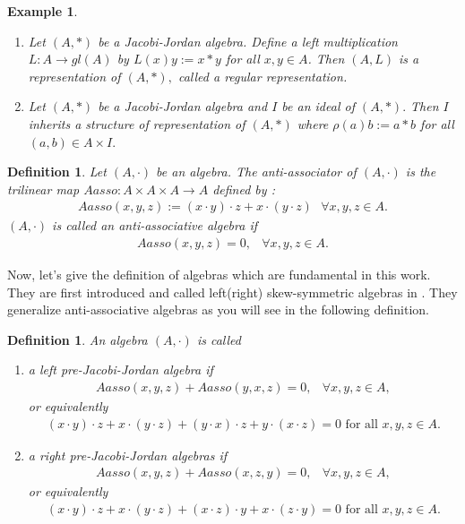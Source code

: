 \documentclass[12pt]{amsart}
\newtheorem{definition}[Theorem]{Definition}
\newtheorem{example}[Theorem]{Example}
\begin{document}
	\begin{example}
		\begin{enumerate}
			\item Let $(A,\ast)$ be a Jacobi-Jordan algebra. Define a left multiplication 
			$ L: A\rightarrow gl(A)$  by $L(x)y:=x\ast y$  for all $x, y \in A$. Then $(A , L)$ is a representation of $(A, \ast),$  called a regular representation.
			\item Let $(A,\ast)$ be a Jacobi-Jordan algebra and $I$ be an ideal of $(A,\ast).$ Then $I$  inherits a structure of representation of $(A,\ast)$ where 
			$\rho(a)b:=a\ast b$ for all $(a,b)\in A\times I.$
		\end{enumerate}
	\end{example} 
	\begin{definition}\label{D1}Let $ (A,\cdot) $ be an algebra.
	The anti-associator of $(A,\cdot) $ is the trilinear map  $ Aasso:A\times A\times A\to A $ defined by :
	\begin{eqnarray}
		\label{1}
		Aasso(x,y,z):= (x\cdot
		y)\cdot z+x\cdot (y\cdot z) \mbox{ \ \ $\forall  x,y,z\in A $.}
	\end{eqnarray}
	$ (A,\cdot) $ is called an anti-associative algebra if 
	\begin{eqnarray}
		\label{2}
		Aasso(x,y,z)=0,& \forall x,y,z\in A. 
	\end{eqnarray}
\end{definition}
Now, let's give the definition of algebras which are fundamental in this work. They are first introduced and called left(right) skew-symmetric algebras in \cite{absb}. They generalize anti-associative algebras as you will see in the following definition.
	\begin{definition}
		\label{D4}
		An algebra $ (A,\cdot) $ is called 
		\begin{enumerate}
			\item a left pre-Jacobi-Jordan algebra if
			\begin{eqnarray}
				\label{6}
				Aasso(x,y,z)+Aasso(y,x,z)=0,& \forall x,y,z\in A,
			\end{eqnarray}
			or equivalently
			\begin{eqnarray}
				(x\cdot y)\cdot z+x\cdot(y\cdot z)+(y\cdot x)\cdot z+y\cdot(x\cdot z)=0
				\mbox{ for all $x,y,z\in A.$} \label{6l}
			\end{eqnarray}		 
			\item a right pre-Jacobi-Jordan algebras if
			\begin{eqnarray}
				\label{19}
				Aasso(x,y,z)+Aasso(x,z,y)=0,& \forall x,y,z\in A,
			\end{eqnarray}
			or equivalently
			\begin{eqnarray}
				(x\cdot y)\cdot z+x\cdot(y\cdot z)+(x\cdot z)\cdot y+x\cdot(z\cdot y)=0
				\mbox{ for all $x,y,z\in A.$}\label{19r}
			\end{eqnarray}
		\end{enumerate}
	\end{definition}
\end{document}
